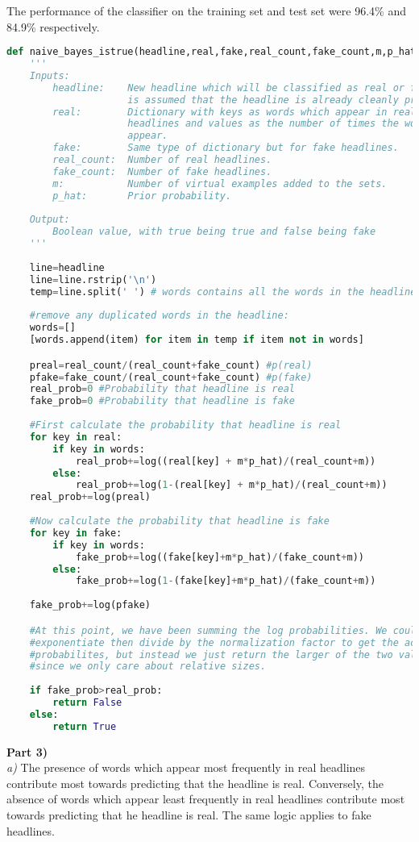 \documentclass{article}
\theoremstyle{mytheor}
\theoremstyle{definition}
\begin{document}
The performance of the classifier on the training set and test set were 96.4\% and 84.9\% respectively.\\
\begin{lstlisting}[language=Python, caption=Naive Bayes Classifier]
def naive_bayes_istrue(headline,real,fake,real_count,fake_count,m,p_hat):
    '''
    Inputs:
        headline:    New headline which will be classified as real or fake. It 
                     is assumed that the headline is already cleanly processed.
        real:        Dictionary with keys as words which appear in real  
                     headlines and values as the number of times the words 
                     appear.
        fake:        Same type of dictionary but for fake headlines.
        real_count:  Number of real headlines.
        fake_count:  Number of fake headlines.
        m:           Number of virtual examples added to the sets.
        p_hat:       Prior probability. 
        
    Output:
        Boolean value, with true being true and false being fake
    '''
    
    line=headline
    line=line.rstrip('\n')
    temp=line.split(' ') # words contains all the words in the headline
    
    #remove any duplicated words in the headline:
    words=[]
    [words.append(item) for item in temp if item not in words]

    preal=real_count/(real_count+fake_count) #p(real)
    pfake=fake_count/(real_count+fake_count) #p(fake)
    real_prob=0 #Probability that headline is real
    fake_prob=0 #Probability that headline is fake
    
    #First calculate the probability that headline is real
    for key in real:
        if key in words:
            real_prob+=log((real[key] + m*p_hat)/(real_count+m))
        else:
            real_prob+=log(1-(real[key] + m*p_hat)/(real_count+m))
    real_prob+=log(preal)
    
    #Now calculate the probability that headline is fake
    for key in fake:
        if key in words:
            fake_prob+=log((fake[key]+m*p_hat)/(fake_count+m))
        else:
            fake_prob+=log(1-(fake[key]+m*p_hat)/(fake_count+m))
    
    fake_prob+=log(pfake)

    #At this point, we have been summing the log probabilities. We could 
    #exponentiate then divide by the normalization factor to get the actual
    #probabilites, but instead we just return the larger of the two values 
    #since we only care about relative sizes.
    
    if fake_prob>real_prob:
        return False
    else:
        return True
\end{lstlisting}
\newpage
\textbf{Part 3)}\\
\textit{a)} The presence of words which appear most frequently in real headlines contribute most towards predicting that the headline is real. Conversely, the absence of words which appear least frequently in real headlines contribute most towards predicting that he headline is real. The same logic applies to fake headlines.\\
\end{document}
